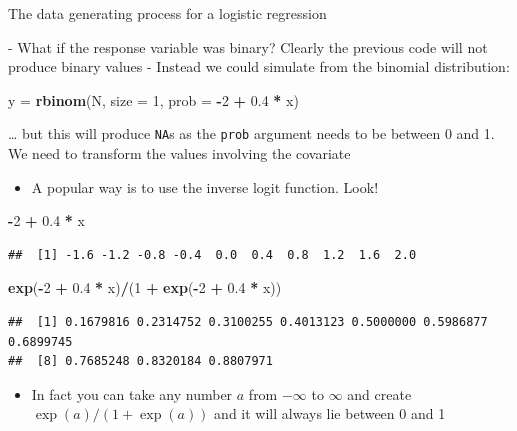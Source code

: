 \documentclass[ignorenonframetext,]{beamer}
\newenvironment{Shaded}{\begin{snugshade}}{\end{snugshade}}
\newcommand{\KeywordTok}[1]{\textcolor[rgb]{0.13,0.29,0.53}{\textbf{#1}}}
\newcommand{\DataTypeTok}[1]{\textcolor[rgb]{0.13,0.29,0.53}{#1}}
\newcommand{\DecValTok}[1]{\textcolor[rgb]{0.00,0.00,0.81}{#1}}
\newcommand{\FloatTok}[1]{\textcolor[rgb]{0.00,0.00,0.81}{#1}}
\newcommand{\StringTok}[1]{\textcolor[rgb]{0.31,0.60,0.02}{#1}}
\newcommand{\OperatorTok}[1]{\textcolor[rgb]{0.81,0.36,0.00}{\textbf{#1}}}
\newcommand{\NormalTok}[1]{#1}
\providecommand{\tightlist}{%
  \setlength{\itemsep}{0pt}\setlength{\parskip}{0pt}}
\begin{document}
\begin{frame}[fragile]{The data generating process for a logistic
regression}

\scriptsize
- What if the response variable was binary? Clearly the previous code
will not produce binary values - Instead we could simulate from the
binomial distribution:

\begin{Shaded}
\begin{Highlighting}[]
\NormalTok{y =}\StringTok{ }\KeywordTok{rbinom}\NormalTok{(N, }\DataTypeTok{size =} \DecValTok{1}\NormalTok{, }\DataTypeTok{prob =} \OperatorTok{-}\DecValTok{2} \OperatorTok{+}\StringTok{ }\FloatTok{0.4} \OperatorTok{*}\StringTok{ }\NormalTok{x)}
\end{Highlighting}
\end{Shaded}

\ldots{} but this will produce \texttt{NA}s as the \texttt{prob}
argument needs to be between 0 and 1. We need to transform the values
involving the covariate

\begin{itemize}
\tightlist
\item
  A popular way is to use the inverse logit function. Look!
\end{itemize}

\begin{Shaded}
\begin{Highlighting}[]
\OperatorTok{-}\DecValTok{2} \OperatorTok{+}\StringTok{ }\FloatTok{0.4} \OperatorTok{*}\StringTok{ }\NormalTok{x}
\end{Highlighting}
\end{Shaded}

\begin{verbatim}
##  [1] -1.6 -1.2 -0.8 -0.4  0.0  0.4  0.8  1.2  1.6  2.0
\end{verbatim}

\begin{Shaded}
\begin{Highlighting}[]
\KeywordTok{exp}\NormalTok{(}\OperatorTok{-}\DecValTok{2} \OperatorTok{+}\StringTok{ }\FloatTok{0.4} \OperatorTok{*}\StringTok{ }\NormalTok{x)}\OperatorTok{/}\NormalTok{(}\DecValTok{1} \OperatorTok{+}\StringTok{ }\KeywordTok{exp}\NormalTok{(}\OperatorTok{-}\DecValTok{2} \OperatorTok{+}\StringTok{ }\FloatTok{0.4} \OperatorTok{*}\StringTok{ }\NormalTok{x))}
\end{Highlighting}
\end{Shaded}

\begin{verbatim}
##  [1] 0.1679816 0.2314752 0.3100255 0.4013123 0.5000000 0.5986877 0.6899745
##  [8] 0.7685248 0.8320184 0.8807971
\end{verbatim}

\begin{itemize}
\tightlist
\item
  In fact you can take any number \(a\) from \(-\infty\) to \(\infty\)
  and create \(\exp(a)/(1+\exp(a))\) and it will always lie between 0
  and 1
\end{itemize}

\end{frame}
\end{document}
